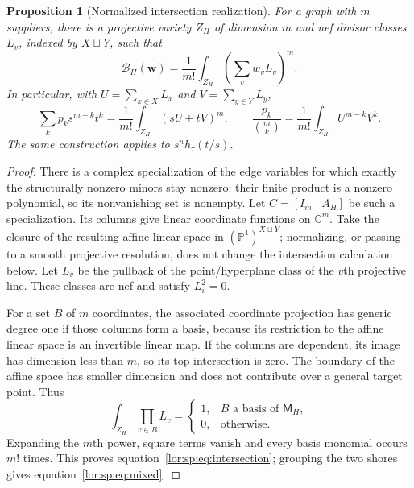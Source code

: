 \documentclass[11pt]{article}
\numberwithin{equation}{section}
\newtheorem{proposition}[theorem]{Proposition}
\theoremstyle{definition}
\newcommand{\C}{\mathbb C}
\newcommand{\cB}{\mathcal B}
\begin{document}
\begin{proposition}[Normalized intersection realization]
\label{lor:sp:prop:geometry}
For a graph with $m$ suppliers, there is a projective variety $Z_H$ of dimension
$m$ and nef divisor classes $L_v$, indexed by $X\sqcup Y$, such that
\begin{equation}
 \cB_H(\mathbf w)=\frac1{m!}\int_{Z_H}\left(\sum_v w_v L_v\right)^m.
 \label{lor:sp:eq:intersection}
\end{equation}
In particular, with $U=\sum_{x\in X}L_x$ and $V=\sum_{y\in Y}L_y$,
\begin{equation}
 \sum_k p_k s^{m-k}t^k
 =\frac1{m!}\int_{Z_H}(sU+tV)^m,
 \qquad
 \frac{p_k}{\binom m k}=\frac1{m!}\int_{Z_H}U^{m-k}V^k.
 \label{lor:sp:eq:mixed}
\end{equation}
The same construction applies to $s^n h_\tau(t/s)$.
\end{proposition}
\begin{proof}
There is a complex specialization of the edge variables for which exactly the
structurally nonzero minors stay nonzero: their finite product is a nonzero
polynomial, so its nonvanishing set is nonempty. Let $C=[I_m\mid A_H]$ be
such a specialization. Its columns give linear coordinate functions on
$\C^m$. Take the closure of the resulting affine linear space in
$(\mathbb P^1)^{X\sqcup Y}$; normalizing, or passing to a smooth projective
resolution, does not change the intersection calculation below. Let $L_v$
be the pullback of the point/hyperplane class of the $v$th projective line.
These classes are nef and satisfy $L_v^2=0$.

For a set $B$ of $m$ coordinates, the associated coordinate projection has
generic degree one if those columns form a basis, because its restriction to
the affine linear space is an invertible linear map. If the columns are
dependent, its image has dimension less than $m$, so its top intersection is
zero. The boundary of the affine space has smaller dimension and does not
contribute over a general target point. Thus
\[
 \int_{Z_H}\prod_{v\in B}L_v=
 \begin{cases}1,&B\text{ a basis of }\mathsf M_H,\\0,&\text{otherwise.}\end{cases}
\]
Expanding the $m$th power, square terms vanish and every basis monomial occurs
$m!$ times. This proves equation~\eqref{lor:sp:eq:intersection}; grouping the two shores gives
equation~\eqref{lor:sp:eq:mixed}.
\end{proof}
\end{document}
